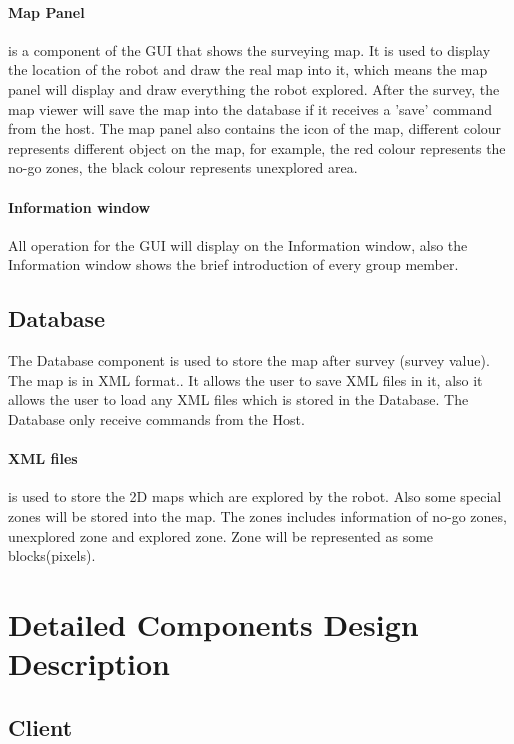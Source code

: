\documentclass[11pt, a4paper]{report}
\begin{document}
\paragraph{Map Panel} is a component of the GUI that shows the surveying map. 
It is used to display the location of the robot and draw the real map into it, 
which means the map panel will display and draw everything the robot explored. 
After the survey, the map viewer will save the map into the database if it receives a 'save' command 
from the host. The map panel also contains the icon of the map, different colour represents different object on the map, for example, the red colour represents the no-go zones, the black colour represents unexplored area.
\paragraph{Information window} All operation for the GUI will display on the Information window, also the Information window shows the brief introduction of every group member.
\subsection{Database} The Database component is used to store the map after survey (survey value).
 The map is in XML format.. It allows the user to save XML files in it, also it allows the user to load any XML files which is stored in the Database.
  The Database only receive commands from the Host.
\paragraph{XML files} is used to store the 2D maps which are explored by the robot. Also some special zones will be stored into the map. The zones includes information of no-go zones, unexplored zone and explored zone. Zone will be represented as some blocks(pixels).


\section{Detailed Components Design Description}
\subsection{Client}
\end{document}
